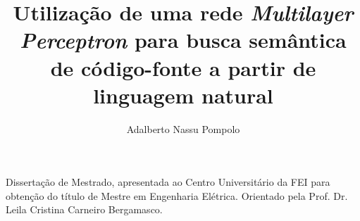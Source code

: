 \documentclass[font=arial,acronym,symbols]{fei}
\author{Adalberto Nassu Pompolo}
\title{Utilização de uma rede \textit{Multilayer Perceptron} para busca semântica de código-fonte a partir de linguagem natural}
\begin{document}
\maketitle

\begin{folhaderosto}
Dissertação de Mestrado, apresentada ao Centro Universitário da FEI para obtenção do título de Mestre em Engenharia Elétrica. Orientado pela Prof. Dr. Leila Cristina Carneiro Bergamasco.
\end{folhaderosto}

\fichacatalografica
\folhadeaprovacao






\printglossaries
\tableofcontents










\printbibliography

\end{document}
